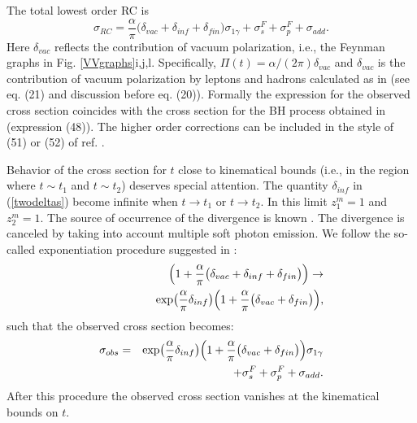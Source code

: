 \documentclass[aps,prd,reprint,groupedaddress,preprintnumbers,showpacs]{revtex4-1}
\begin{document}
The total lowest order RC 
is
\begin{equation}\label{eqeq30}
\sigma _{RC}= \frac{\alpha}{\pi}\bigl( \delta_{vac}+\delta_{inf}+\delta_{fin}\bigr) \sigma _{1\gamma} + \sigma_{s}^F+\sigma_p^F+\sigma_{add}.
\end{equation}
Here $\delta_{vac}$ reflects the contribution of vacuum polarization, i.e., the Feynman graphs in Fig. \ref{VVgraphs}i,j,l. Specifically, $ \Pi (t)=\alpha/(2\pi)\delta_{vac}$  and $\delta_{vac}$ is the contribution of vacuum polarization by leptons and hadrons calculated as in \cite{AKSh1994} (see eq. (21) and discussion before eq. (20)). Formally the expression for the observed cross section coincides with the cross section for the BH process obtained in \cite{AkushevichIlyichev2012} (expression (48)). The higher order corrections can be included in the style of (51) or (52) of ref. \cite{AkushevichIlyichev2012}.


Behavior of the cross section for $t$ close to kinematical bounds (i.e., in the region where $t\sim t_1$ and $t\sim t_2$) deserves special attention. The quantity $\delta_{inf}$ in (\ref{twodeltas}) become infinite when $t \rightarrow t_1$ or $t \rightarrow t_2$. In this limit $z_1^m=1$ and $z_2^m=1$. The source of occurrence of the divergence is known \cite{YennieFrautschiSuura1961}. The divergence is canceled by taking into account multiple soft photon emission. We follow the so-called exponentiation procedure suggested in \cite{Shumeiko}:
\begin{eqnarray}\label{exponentiation}
&&\Bigl( 1 + \frac{\alpha}{\pi}\bigl( \delta_{vac}+\delta_{inf}+\delta_{fin}\bigr)\Bigr)
\rightarrow \\
&&\qquad \qquad \exp\bigl(\frac{\alpha}{\pi} \delta_{inf}\bigr)\Bigl( 1 + \frac{\alpha}{\pi}\bigl( \delta_{vac}+\delta_{fin}\bigr)\Bigr), \nonumber
\end{eqnarray}
such that the observed cross section becomes:
\begin{eqnarray}
\sigma _{obs}&=&\exp\bigl(\frac{\alpha}{\pi} \delta_{inf}\bigr)\Bigl( 1 + \frac{\alpha}{\pi}\bigl( \delta_{vac}+\delta_{fin}\bigr)\Bigr)
 \sigma _{1\gamma} 
\nonumber \\&&
 + \sigma_{s}^F+\sigma_p^F+\sigma_{add}.
\end{eqnarray}
After this procedure the observed cross section vanishes at the kinematical bounds on $t$.
\end{document}
